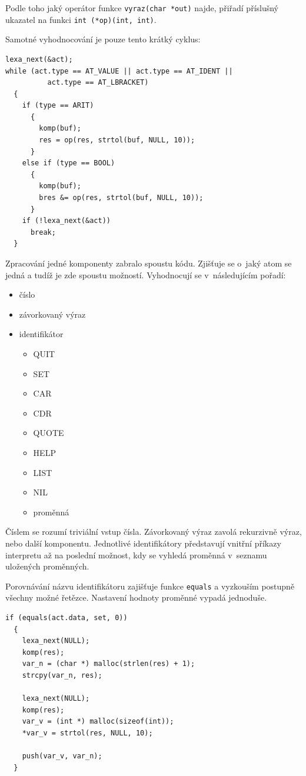 \documentclass[a4paper, 12pt]{article}
\begin{document}
Podle toho jaký operátor funkce \texttt{vyraz(char *out)} najde,
přiřadí příslušný ukazatel na funkci \verb+int (*op)(int, int)+.

Samotné vyhodnocování je pouze tento krátký cyklus:
\begin{lstlisting}
lexa_next(&act);
while (act.type == AT_VALUE || act.type == AT_IDENT ||
          act.type == AT_LBRACKET)
  {
    if (type == ARIT)
      {
        komp(buf);
        res = op(res, strtol(buf, NULL, 10));
      }
    else if (type == BOOL)
      {
        komp(buf);
        bres &= op(res, strtol(buf, NULL, 10));
      }
    if (!lexa_next(&act))
      break;
  }
\end{lstlisting}

Zpracování jedné komponenty zabralo spoustu kódu.  Zjišťuje se o~jaký
atom se jedná a tudíž je zde spoustu možností. Vyhodnocují se
v~následujícím pořadí:
\begin{itemize}
\item číslo
\item závorkovaný výraz
\item identifikátor
\begin{itemize}
\item QUIT
\item SET
\item CAR
\item CDR
\item QUOTE
\item HELP
\item LIST
\item NIL
\item proměnná
\end{itemize}

\end{itemize}

Číslem se rozumí triviální vstup čísla. Závorkovaný výraz zavolá
rekurzivně výraz, nebo další komponentu. Jednotlivé identifikátory představují
vnitřní příkazy interpretu až na poslední možnost, kdy se vyhledá
proměnná v~seznamu uložených proměnných.

Porovnávání názvu identifikátoru zajišťuje funkce \texttt{equals} a
vyzkouším postupně všechny možné řetězce. Nastavení hodnoty proměnné
vypadá jednoduše.

\begin{lstlisting}
if (equals(act.data, set, 0))
  {
    lexa_next(NULL);
    komp(res);
    var_n = (char *) malloc(strlen(res) + 1);
    strcpy(var_n, res);

    lexa_next(NULL);
    komp(res);
    var_v = (int *) malloc(sizeof(int));
    *var_v = strtol(res, NULL, 10);
	  
    push(var_v, var_n);
  }
\end{lstlisting}
\end{document}
